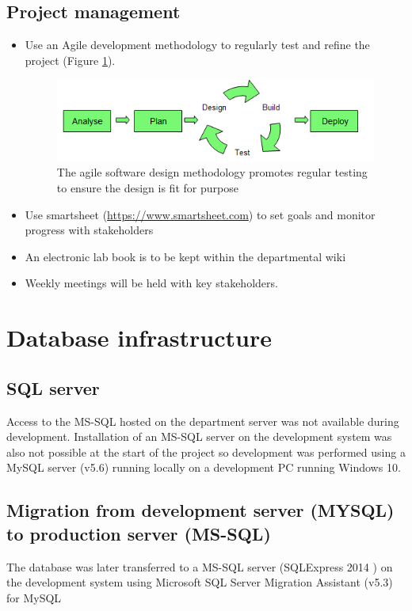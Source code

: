 \subsection{Project management}
\begin{itemize}
\item Use an Agile development methodology to regularly test and refine the project (Figure \ref{fig:Agile}).
\begin{figure}[h]
\centering
\includegraphics[width=1\linewidth]{./Figures/Agile}
\caption[Agile development methodology]{The agile software design methodology promotes regular testing to ensure the design is fit for purpose}
\label{fig:Agile}
\end{figure}
\item Use smartsheet (\url{https://www.smartsheet.com}) to set goals and monitor progress with stakeholders 
\item An electronic lab book is to be kept within the departmental wiki
\item Weekly meetings will be held with key stakeholders.
\end{itemize}

\section{Database infrastructure}
\subsection{SQL server}
Access to the MS-SQL hosted on the department server was not available during development. Installation of an MS-SQL server on the development system was also not possible at the start of the project so development was performed using a MySQL server (v5.6)\cite{mysql_mysql_????} running locally on a development PC running Windows 10. 

\subsection{Migration from development server (MYSQL) to production server (MS-SQL)}
The database was later transferred to a MS-SQL server (SQLExpress 2014 \cite{_sql_????}) on the development system using Microsoft SQL Server Migration Assistant (v5.3) for MySQL \cite{_microsoft_????}
